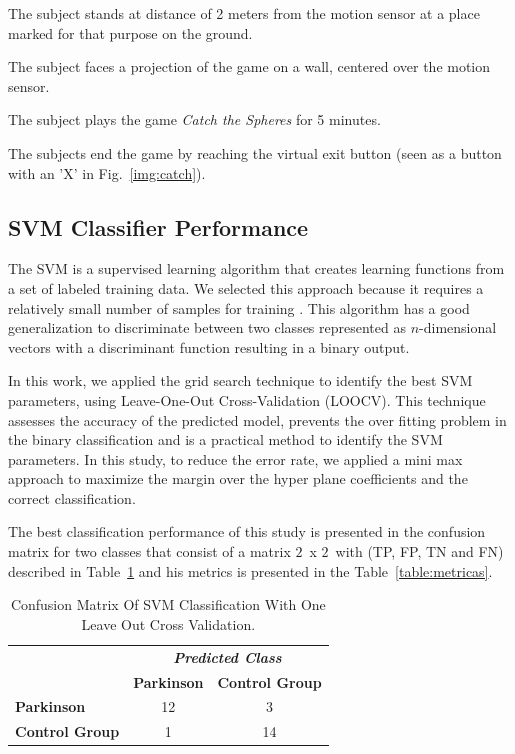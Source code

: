 \documentclass[10pt, conference, compsocconf]{IEEEtran}
\begin{document}
\begin{compactenum}
	\item The subject stands at distance of 2 meters from the motion sensor at a place marked for that purpose on the ground.
	\item The subject faces a projection of the game on a wall, centered over the motion sensor.
	\item The subject plays the game \textit{Catch the Spheres} for 5 minutes.
	\item The subjects end the game by reaching the virtual exit button (seen as a button with an 'X' in Fig.~\ref{img:catch}).
\end{compactenum} 

\subsection{SVM Classifier Performance}
\label{classifier_performance}

The SVM is a supervised learning algorithm that creates learning functions from a set of labeled training data. We selected this approach because it requires a relatively small number of samples for training \cite{kantardzic2011data}. This algorithm has a good generalization to discriminate between two classes represented as $n$-dimensional vectors with a discriminant function resulting in a binary output.

In this work, we applied the grid search technique \cite{kantardzic2011data} to identify the best SVM parameters, using Leave-One-Out Cross-Validation (LOOCV). This technique assesses the accuracy of the predicted model, prevents the over fitting problem in the binary classification and is a practical method to identify the SVM parameters. In this study, to reduce the error rate, we applied a mini max approach to maximize the margin over the hyper plane coefficients and the correct classification.


The best classification performance of this study is presented in the confusion matrix \cite{kantardzic2011data} for two classes that consist of a matrix $2$\ x $2$\, with (TP, FP, TN and FN) described in Table~\ref{table:resultadomatrizconfusaosvm} and his metrics is presented in the Table~\ref{table:metricas}.

\begin{table}[!htbp]
\caption{Confusion Matrix Of SVM Classification With One Leave Out Cross Validation.}
\label{table:resultadomatrizconfusaosvm}
\centering
\begin{tabular}{l|c|c|}
\cline{2-3}
\multicolumn{1}{c}{}                         & \multicolumn{2}{|c|}{\textit{\textbf{Predicted Class}}} \\ \cline{2-3} 
                                             & \textbf{Parkinson}      & \textbf{Control Group}         \\ \hline
\multicolumn{1}{|l|}{\textbf{Parkinson}} & 12       & 3          \\ \hline
\multicolumn{1}{|l|}{\textbf{Control Group}}     & 1           & 14     \\ \hline
\end{tabular}
\end{table}
\end{document}

